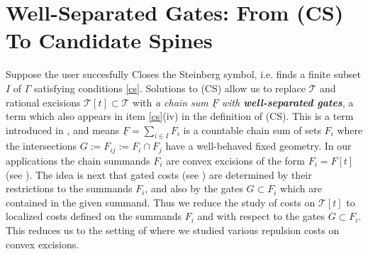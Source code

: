 \documentclass[12pt]{amsart}
\theoremstyle{definition}
\theoremstyle{remark}
\newcommand{\bZ}{\mathbb{Z}}
\newcommand{\uF}{\underline{F}}
\newcommand{\sT}{\mathscr{T}}
\begin{document}



\section{Well-Separated Gates: From (CS) To Candidate Spines}
Suppose the user succesfully Closes the Steinberg symbol, i.e. finds a finite subset $I$ of $\Gamma$ satisfying conditions \ref{cs}. Solutions to (CS) allow us to replace $\sT$ and rational excisions $\sT[t] \subset \sT$ with \emph{ a chain sum $\uF$ with \textbf{well-separated gates}}, a term which also appears in item \eqref{cs}(iv) in the definition of (CS). This is a term introduced in \cite[pp.13, \S 5.1]{martel}, and means $\uF=\sum_{i\in I} F_i$ is a countable chain sum of sets $F_i$ where the intersections $G:=F_{ij}:=F_i\cap F_j$ have a well-behaved fixed geometry. In our applications the chain summands $F_i$ are convex excisions of the form $F_i=F[t]$ (see \cite[\S 5.5]{martel}). The idea is next that gated costs (see \cite[\S 5.2]{martel}) are determined by their restrictions to the summands $F_i$, and also by the gates $G\subset F_i$ which are contained in the given summand. Thus we reduce the study of costs on $\sT[t]$ to localized costs defined on the summands $F_i$ and with respect to the gates $G\subset F_i$. This reduces us to the setting of \cite[\S 5.9]{martel} where we studied various repulsion costs on convex excisions. 
\end{document}
